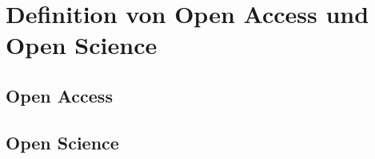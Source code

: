 \section{Definition von Open Access und Open Science}
\subsection{Open Access}
\subsection{Open Science}